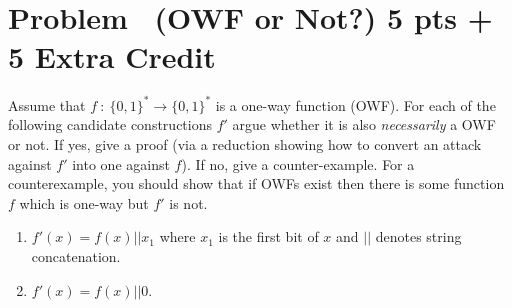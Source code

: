 \documentclass[11pt]{article}
\newcounter{pppp}
\newcommand{\prob}{\arabic{pppp}}  %
\newcommand{\increase}{\addtocounter{pppp}{1}}  %
\newcommand{\newproblem}[2]{\increase
	\section*{Problem \prob~(#1) \hfill {#2}}}
\begin{document}
\newproblem{OWF or Not?}{5 pts + 5 Extra Credit} Assume that  $f~:~\{0,1\}^* \rightarrow \{0,1\}^*$ is a one-way function (OWF). 
For each of the following candidate  constructions $f'$ argue whether it is also \emph{necessarily} a OWF or not. If yes, give a proof (via a reduction showing how to convert an attack against $f'$ into one against $f$). If no, give a counter-example. For a counterexample, you should show that if OWFs exist then there is some function $f$ which is one-way but $f'$ is not. 

\begin{enumerate}
	\item $f'(x) = f(x)||x_1$ where $x_1$ is the first bit of $x$ and $||$ denotes string concatenation.   
	\item $f'(x) = f(x)||0$.
\end{enumerate}
\end{document}
